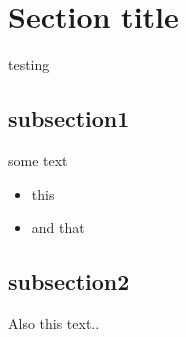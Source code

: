\section{Section title}

testing
\subsection{subsection1}
some text
\begin{itemize}
\item this
\item and that
\end{itemize}
\subsection{subsection2}
Also this text..

